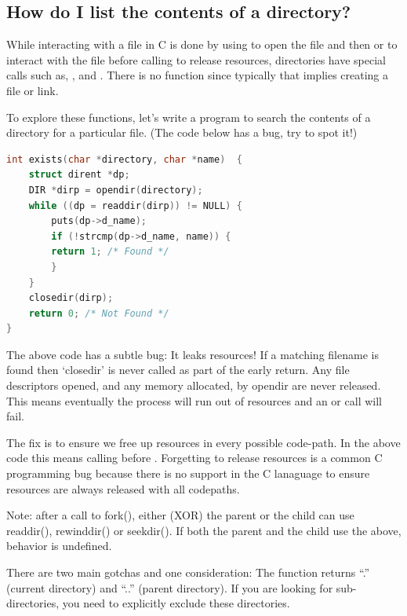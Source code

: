 \subsection{How do I list the contents of a directory?}

While interacting with a file in C is done by using  to open the file and then  or  to interact with the file before calling  to release resources, directories have special calls such as, ,  and . There is no function  since typically that implies creating a file or link.

To explore these functions, let's write a program to search the contents of a directory for a particular file. (The code below has a bug, try to spot it!)

\begin{lstlisting}[language=C]
int exists(char *directory, char *name)  {
    struct dirent *dp;
    DIR *dirp = opendir(directory);
    while ((dp = readdir(dirp)) != NULL) {
        puts(dp->d_name);
        if (!strcmp(dp->d_name, name)) {
        return 1; /* Found */
        }
    }
    closedir(dirp);
    return 0; /* Not Found */
}
\end{lstlisting}

The above code has a subtle bug: It leaks resources! If a matching filename is found then `closedir' is never called as part of the early return. Any file descriptors opened, and any memory allocated, by opendir are never released. This means eventually the process will run out of resources and an  or  call will fail.

The fix is to ensure we free up resources in every possible code-path. In the above code this means calling  before . Forgetting to release resources is a common C programming bug because there is no support in the C lanaguage to ensure resources are always released with all codepaths.


Note: after a call to fork(), either (XOR) the parent or the child can use readdir(), rewinddir() or seekdir(). If both the parent and the child use the above, behavior is undefined.

There are two main gotchas and one consideration: The  function returns ``.'' (current directory) and ``..'' (parent directory). If you are looking for sub-directories, you need to explicitly exclude these directories.

